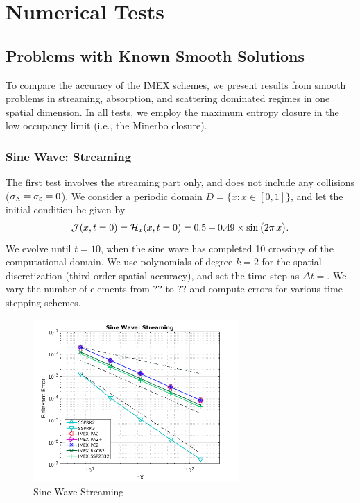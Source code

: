 \section{Numerical Tests}
\label{sec:numerical}

\subsection{Problems with Known Smooth Solutions}

To compare the accuracy of the IMEX schemes, we present results from smooth problems in streaming, absorption, and scattering dominated regimes in one spatial dimension.  
In all tests, we employ the maximum entropy closure in the low occupancy limit (i.e., the Minerbo closure).  

\subsubsection{Sine Wave: Streaming}

The first test involves the streaming part only, and does not include any collisions ($\sigma_{\mbox{\tiny A}}=\sigma_{\mbox{\tiny S}}=0$).  
We consider a periodic domain $D=\{x:x\in[0,1]\}$, and let the initial condition be given by
\begin{equation}
  \mathcal{J}(x,t=0)=\mathcal{H}_{x}(x,t=0)=0.5+0.49\times\sin\big(2\pi\,x\big).  
\end{equation}
We evolve until $t=10$, when the sine wave has completed 10 crossings of the computational domain.  
We use polynomials of degree $k=2$ for the spatial discretization (third-order spatial accuracy), and set the time step as $\Delta t = $.  
We vary the number of elements from $??$ to $??$ and compute errors for various time stepping schemes.  


\begin{figure}[h]
  \centering
    \includegraphics[width=0.7\textwidth]{figures/SineWaveStreaming}
   \caption{Sine Wave Streaming}
  \label{fig:SineWaveStreaming}
\end{figure}

